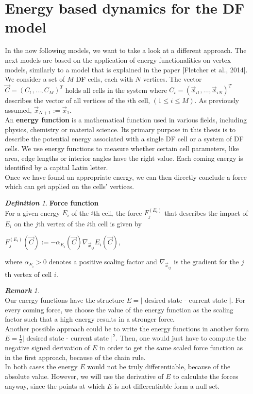 \documentclass[a4paper,12pt,leqno]{article}
\theoremstyle{plain}
\theoremstyle{remark}
\newtheorem{remark}[theorem]{\bf Remark}
\newtheorem{definition}[theorem]{\bf Definition}
\begin{document}
\section{Energy based dynamics for the DF model} \label{sec:energyModels}
In the now following models, we want to take a look at a different approach. The next models are based on the application of energy functionalities on vertex models, similarly to a model that is explained in the paper [Fletcher et al., 2014]. We consider a set of $M$ DF cells, each with $N$ vertices. The vector $\vec{C} = ( C_1, \dots, C_M)^T$ holds all cells in the system where $C_i = (\vec{x}_{i1}, \ldots, \vec{x}_{iN})^T$ describes the vector of all vertices of the $i$th cell, $( 1 \leq i \leq M)$. As previously assumed, $\vec{x}_{N+1} := \vec{x}_{1}$.\\
An \textbf{energy function} is a mathematical function used in various fields, including physics, chemistry or material science. Its primary purpose in this thesis is to describe the potential energy associated with a single DF cell or a system of DF cells. We use energy functions to measure whether certain cell parameters, like area, edge lengths or interior angles have the right value. Each coming energy is identified by a capital Latin letter. \\
Once we have found an appropriate energy, we can then directly conclude a force which can get applied on the cells' vertices. \\
\begin{definition} \textbf{Force function} \label{def:forceFunction}\\
	For a given energy $E_i$ of the $i$th cell, the force $F_{j}^{(E_i)}$ that describes the impact of $E_i$ on the $j$th vertex of the $i$th cell is given by
	\begin{center}
		$F_{j}^{(E_i)}(\vec{C}) := -\alpha_{E_i}(\vec{C}) \nabla_{\vec{x}_{ij}} E_i(\vec{C})$,
	\end{center}
	where $\alpha_{E_i} > 0$ denotes a positive scaling factor and $\nabla_{\vec{x}_{ij}}$ is the gradient for the $j$th vertex of cell $i$. 	\\
\end{definition}
\begin{remark}\textbf{}\\
	Our energy functions have the structure $E = |$ desired state - current state $|$. For every coming force, we choose the value of the energy function as the scaling factor such that a high energy results in a stronger force. \\
	Another possible approach could be to write the energy functions in another form $E = \frac{1}{2} |$ desired state - current state $|^2$. Then, one would just have to compute the negative signed derivation of $E$ in order to get the same scaled force function as in the first approach, because of the chain rule. \\
	In both cases the energy $E$ would not be truly differentiable, because of the absolute value. However, we will use the derivative of $E$ to calculate the forces anyway, since the points at which $E$ is not differentiable form a null set.\\
\end{remark}
\end{document}
